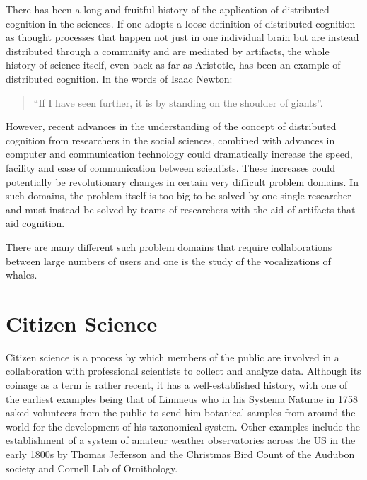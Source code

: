 There has been a long and fruitful history of the application of
distributed cognition in the sciences.  If one adopts a loose
definition of distributed cognition as thought processes that happen
not just in one individual brain but are instead distributed through
a community and are mediated by artifacts, the whole history of
science itself, even back as far as Aristotle, has been an example of
distributed cognition.  In the words of Isaac Newton:

\begin{quote}
 ``If I have seen further, it is by standing on the shoulder of
  giants''.
\end{quote}

However, recent advances in the understanding of the concept of
distributed cognition from researchers in the social sciences,
combined with advances in computer and communication technology could
dramatically increase the speed, facility and ease of communication
between scientists.  These increases could potentially be
revolutionary changes in certain very difficult problem domains.  In
such domains, the problem itself is too big to be solved by one single
researcher and must instead be solved by teams of researchers with the
aid of artifacts that aid cognition.

There are many different such problem domains that require
collaborations between large numbers of users and one is the study of
the vocalizations of whales.

\section{Citizen Science}
\label{section:relatedWork:citizenScience}

Citizen science is a process by which members of the public are
involved in a collaboration with professional scientists to collect
and analyze data.  Although its coinage as a term is rather recent, it
has a well-established history, with one of the earliest examples
being that of Linnaeus who in his Systema Naturae
\cite{linnaeus1758systema} in 1758 asked volunteers from the public to
send him botanical samples from around the world for the development
of his taxonomical system.  Other examples include the establishment
of a system of amateur weather observatories across the US in the
early 1800s by Thomas Jefferson \cite{fiebrich2009history} and the
Christmas Bird Count \cite{lebaron2009bird} of the Audubon society and
Cornell Lab of Ornithology.

